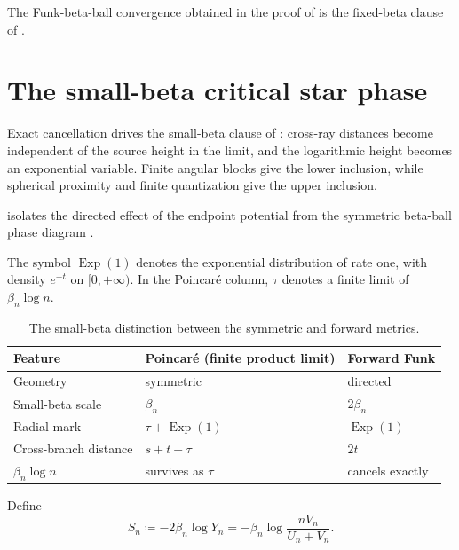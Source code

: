 \documentclass[10pt,a4paper]{amsart}
\numberwithin{equation}{section}
\begin{document}
The Funk-beta-ball convergence obtained in the proof of  is the fixed-beta clause of
.

\section{The small-beta critical star phase}\label{sec:small-beta}

Exact cancellation drives the small-beta clause of : cross-ray distances become independent of the source height in the limit, and the logarithmic height becomes an exponential variable.  Finite angular blocks give the lower inclusion, while spherical proximity and finite quantization give the upper inclusion.

 isolates the directed effect of the endpoint potential from the symmetric beta-ball phase diagram \cite{yokota-poincare-beta-balls}.

The symbol $\operatorname{Exp}(1)$ denotes the exponential distribution of rate one, with density $e^{-t}$ on $[0,+\infty)$.
In the Poincar\'e column, $\tau$ denotes a finite limit of $\beta_n\log n$.

\begin{table}[ht]
\centering
\small
\setlength{\tabcolsep}{5pt}
\renewcommand{\arraystretch}{1.15}
\begin{tabular}{@{}p{}p{}p{}@{}}
\toprule
\raggedright Feature & \raggedright Poincar\'e (finite product limit) & \raggedright Forward Funk \tabularnewline
\midrule
Geometry & symmetric & directed \\
Small-beta scale & $\beta_n$ & $2\beta_n$ \\
Radial mark & $\tau+\operatorname{Exp}(1)$ & $\operatorname{Exp}(1)$ \\
Cross-branch distance & $s+t-\tau$ & $2t$ \\
$\beta_n\log n$ & survives as $\tau$ & cancels exactly \\
\bottomrule
\end{tabular}
\caption{The small-beta distinction between the symmetric and forward metrics.}
\label{tab:poincare-funk-small-beta}
\end{table}

Define
\begin{equation}\label{eq:small-beta-radial} S_n\coloneqq-2\beta_n\log Y_n =-\beta_n\log\frac{nV_n}{U_n+V_n}. \end{equation}
\end{document}
